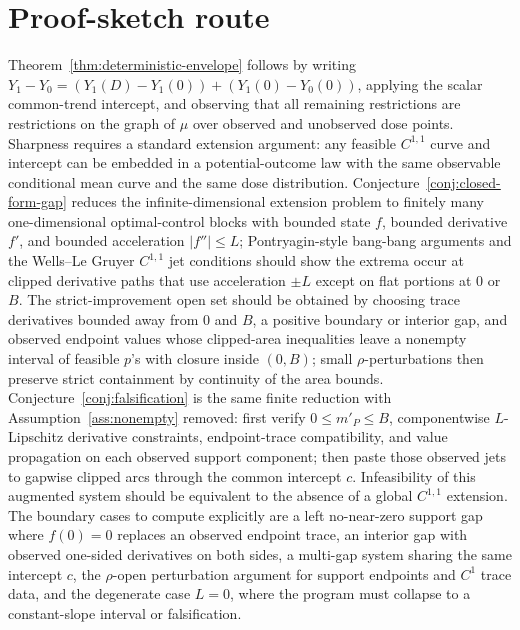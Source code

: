 \documentclass[11pt]{article}
\theoremstyle{definition}
\theoremstyle{plain}
\theoremstyle{remark}
\begin{document}
\section{Proof-sketch route}
Theorem~\ref{thm:deterministic-envelope} follows by writing \(Y_1-Y_0=(Y_1(D)-Y_1(0))+(Y_1(0)-Y_0(0))\), applying the scalar common-trend intercept, and observing that all remaining restrictions are restrictions on the graph of \(\mu\) over observed and unobserved dose points.  Sharpness requires a standard extension argument: any feasible \(C^{1,1}\) curve and intercept can be embedded in a potential-outcome law with the same observable conditional mean curve and the same dose distribution.  Conjecture~\ref{conj:closed-form-gap} reduces the infinite-dimensional extension problem to finitely many one-dimensional optimal-control blocks with bounded state \(f\), bounded derivative \(f'\), and bounded acceleration \(|f''|\le L\); Pontryagin-style bang-bang arguments and the Wells--Le Gruyer \(C^{1,1}\) jet conditions should show the extrema occur at clipped derivative paths that use acceleration \(\pm L\) except on flat portions at \(0\) or \(B\).  The strict-improvement open set should be obtained by choosing trace derivatives bounded away from \(0\) and \(B\), a positive boundary or interior gap, and observed endpoint values whose clipped-area inequalities leave a nonempty interval of feasible \(p\)'s with closure inside \((0,B)\); small \(\rho\)-perturbations then preserve strict containment by continuity of the area bounds.  Conjecture~\ref{conj:falsification} is the same finite reduction with Assumption~\ref{ass:nonempty} removed: first verify \(0\le m'_P\le B\), componentwise \(L\)-Lipschitz derivative constraints, endpoint-trace compatibility, and value propagation on each observed support component; then paste those observed jets to gapwise clipped arcs through the common intercept \(c\).  Infeasibility of this augmented system should be equivalent to the absence of a global \(C^{1,1}\) extension.  The boundary cases to compute explicitly are a left no-near-zero support gap where \(f(0)=0\) replaces an observed endpoint trace, an interior gap with observed one-sided derivatives on both sides, a multi-gap system sharing the same intercept \(c\), the \(\rho\)-open perturbation argument for support endpoints and \(C^1\) trace data, and the degenerate case \(L=0\), where the program must collapse to a constant-slope interval or falsification.
\end{document}
